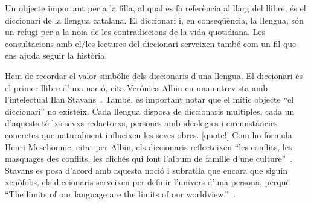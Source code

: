 Un objecte important per a la filla, al qual es fa referència al llarg del llibre, és el diccionari de la llengua catalana.
El diccionari i, en conseqüència, la llengua, són un refugi per a la noia de les contradiccions de la vida quotidiana.
Les consultacions amb el/les lectures del diccionari serveixen també com un fil que ens ajuda seguir la història.

Hem de recordar el valor simbólic dels diccionaris d'una llengua.
El diccionari és el primer llibre d'una nació, cita Verónica Albin en una entrevista amb l'intelectual Ilan Stavans~\autocite{Albin2005}.
També, és important notar que el mític objecte ``el diccionari'' no existeix.
Cada llengua disposa de diccionaris multiples, cada un d'aquests té lxs sevxs redactorxs, persones amb ideologies i circunstàncies concretes que naturalment influeixen les seves obres. [quote!]
Com ho formula Henri Meschonnic, citat per Albin, els diccionaris reflecteixen ``les conflits, les masquages des
conflits, les clichés qui font l'album de famille d'une culture''~\autocite{Albin2005}.
Stavans es posa d'acord amb aquesta noció i subratlla que encara que siguin xenòfobs, els diccionaris serveixen per definir l'univers d'una persona,
perquè ``The limits of our language are the limits of our worldview.''~\autocite{Albin2005}.

